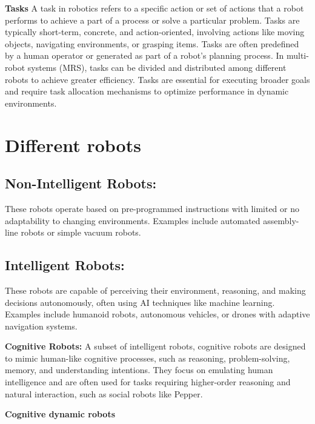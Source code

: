         \textbf{Tasks} A task in robotics refers to a specific action or set of actions that a robot performs to achieve a part of a process or solve a particular problem. Tasks are typically short-term, concrete, and action-oriented, involving actions like moving objects, navigating environments, or grasping items. Tasks are often predefined by a human operator or generated as part of a robot’s planning process. In multi-robot systems (MRS), tasks can be divided and distributed among different robots to achieve greater efficiency. Tasks are essential for executing broader goals and require task allocation mechanisms to optimize performance in dynamic environments.
        \cite{gerkey-2004-task-allocation-multi-robot-systems}

        


\section{Different robots}

    \subsection{Non-Intelligent Robots:} These robots operate based on pre-programmed instructions with limited or no adaptability to changing environments. Examples include automated assembly-line robots or simple vacuum robots. \cite{bekey-2005-autonomous-robots}
    
    \subsection{Intelligent Robots:} These robots are capable of perceiving their environment, reasoning, and making decisions autonomously, often using AI techniques like machine learning. Examples include humanoid robots, autonomous vehicles, or drones with adaptive navigation systems. \cite{siciliano-2016-springer-handbook-robotics}
    
        \textbf{Cognitive Robots:} A subset of intelligent robots, cognitive robots are designed to mimic human-like cognitive processes, such as reasoning, problem-solving, memory, and understanding intentions. They focus on emulating human intelligence and are often used for tasks requiring higher-order reasoning and natural interaction, such as social robots like Pepper. \cite{roy-2005-cognitive-robot}

        \textbf{Cognitive dynamic robots}
        
